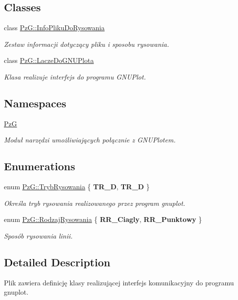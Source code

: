 \subsection*{Classes}
\begin{DoxyCompactItemize}
\item 
class \hyperlink{class_pz_g_1_1_info_pliku_do_rysowania}{Pz\+G\+::\+Info\+Pliku\+Do\+Rysowania}
\begin{DoxyCompactList}\small\item\em Zestaw informacji dotyczący pliku i sposobu rysowania. \end{DoxyCompactList}\item 
class \hyperlink{class_pz_g_1_1_lacze_do_g_n_u_plota}{Pz\+G\+::\+Lacze\+Do\+G\+N\+U\+Plota}
\begin{DoxyCompactList}\small\item\em Klasa realizuje interfejs do programu G\+N\+U\+Plot. \end{DoxyCompactList}\end{DoxyCompactItemize}
\subsection*{Namespaces}
\begin{DoxyCompactItemize}
\item 
 \hyperlink{namespace_pz_g}{Pz\+G}
\begin{DoxyCompactList}\small\item\em Moduł narzędzi umożliwiających połącznie z G\+N\+U\+Plotem. \end{DoxyCompactList}\end{DoxyCompactItemize}
\subsection*{Enumerations}
\begin{DoxyCompactItemize}
\item 
enum \hyperlink{namespace_pz_g_aeedae1ef10c66d720f9e89de408ca4ca}{Pz\+G\+::\+Tryb\+Rysowania} \{ {\bfseries T\+R\+\_\+D}, 
{\bfseries T\+R\+\_\+D}
 \}
\begin{DoxyCompactList}\small\item\em Określa tryb rysowania realizowanego przez program {\ttfamily gnuplot}. \end{DoxyCompactList}\item 
enum \hyperlink{namespace_pz_g_a705c92106f39b7d0c34a6739d10ff0b6}{Pz\+G\+::\+Rodzaj\+Rysowania} \{ {\bfseries R\+R\+\_\+\+Ciagly}, 
{\bfseries R\+R\+\_\+\+Punktowy}
 \}
\begin{DoxyCompactList}\small\item\em Sposób rysowania linii. \end{DoxyCompactList}\end{DoxyCompactItemize}


\subsection{Detailed Description}
Plik zawiera definicję klasy realizującej interfejs komunikacyjny do programu gnuplot. 